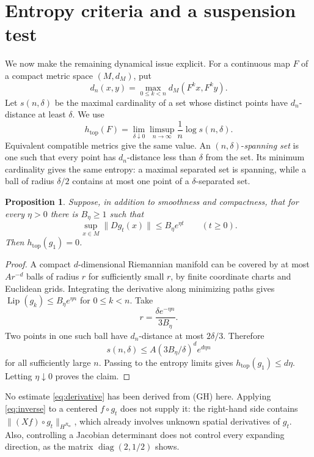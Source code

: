 \documentclass[11pt]{article}
\newtheorem{proposition}[theorem]{Proposition}
\theoremstyle{definition}
\theoremstyle{remark}
\newcommand{\htop}{h_{\mathrm{top}}}
\DeclareMathOperator{\Lip}{Lip}
\begin{document}
\section{Entropy criteria and a suspension test}
\label{sec:entropy}

We now make the remaining dynamical issue explicit. For a continuous map $F$ of a compact metric space $(M,d_M)$, put
\[
 d_n(x,y)=\max_{0\le k<n}d_M(F^kx,F^ky).
\]
Let $s(n,\delta)$ be the maximal cardinality of a set whose distinct points have $d_n$-distance at least $\delta$. We use
\[
 \htop(F)=\lim_{\delta\downarrow0}\limsup_{n\to\infty}
          \frac1n\log s(n,\delta).
\]
Equivalent compatible metrics give the same value. An $(n,\delta)$-\emph{spanning set} is one such that every point has $d_n$-distance less than $\delta$ from the set. Its minimum cardinality gives the same entropy: a maximal separated set is spanning, while a ball of radius $\delta/2$ contains at most one point of a $\delta$-separated set.

\begin{proposition}\label{prop:entropy}
Suppose, in addition to smoothness and compactness, that for every $\eta>0$ there is $B_\eta\ge1$ such that
\begin{equation}\label{eq:derivative}
 \sup_{x\in M}\|Dg_t(x)\|\le B_\eta e^{\eta t}\qquad(t\ge0).
\end{equation}
Then $\htop(g_1)=0$.
\end{proposition}


\begin{proof}
A compact $d$-dimensional Riemannian manifold can be covered by at most $Ar^{-d}$ balls of radius $r$ for sufficiently small $r$, by finite coordinate charts and Euclidean grids. Integrating the derivative along minimizing paths gives
$\Lip(g_k)\le B_\eta e^{\eta n}$ for $0\le k<n$. Take
\[
 r=\frac{\delta e^{-\eta n}}{3B_\eta}.
\]
Two points in one such ball have $d_n$-distance at most $2\delta/3$. Therefore
\[
 s(n,\delta)\le A(3B_\eta/\delta)^d e^{d\eta n}
\]
for all sufficiently large $n$. Passing to the entropy limits gives $\htop(g_1)\le d\eta$. Letting $\eta\downarrow0$ proves the claim.
\end{proof}

No estimate \eqref{eq:derivative} has been derived from (GH) here. Applying \eqref{eq:inverse} to a centered $f\circ g_t$ does not supply it: the right-hand side contains $\|(Xf)\circ g_t\|_{H^{R_m}}$, which already involves unknown spatial derivatives of $g_t$. Also, controlling a Jacobian determinant does not control every expanding direction, as the matrix $\operatorname{diag}(2,1/2)$ shows.
\end{document}
